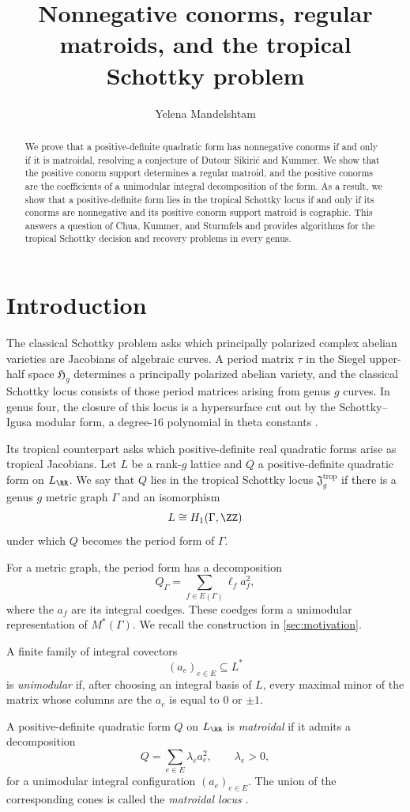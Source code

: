 \documentclass[11pt,letterpaper]{amsart}
\title{Nonnegative conorms, regular matroids, and the tropical Schottky problem}
\author{Yelena Mandelshtam}
\begin{document}
\begin{abstract}
    We prove that a positive-definite quadratic form has nonnegative conorms if and only if it is matroidal, resolving a conjecture of Dutour Sikiri\'c and Kummer. We show that the positive conorm support determines a regular matroid, and the positive conorms are the coefficients of a unimodular integral decomposition of the form. As a result, we show that a positive-definite form lies in the tropical Schottky locus if and only if its conorms are nonnegative and its positive conorm support matroid is cographic. This answers a question of Chua,
Kummer, and Sturmfels and provides algorithms for the tropical Schottky decision and recovery problems in every genus. 
\end{abstract}
\maketitle

\section{Introduction}

The classical Schottky problem asks which principally polarized complex abelian varieties are Jacobians of algebraic curves. A period matrix
$\tau$ in the Siegel upper-half space $\mathfrak H_g$ determines a principally polarized abelian variety, and the classical Schottky locus consists of those period matrices arising from genus $g$ curves. In genus four, the closure of this locus is a hypersurface cut out by the Schottky--Igusa modular form, a degree-$16$ polynomial in theta constants \cite{Igusa,chua2019schottky}. 


Its tropical counterpart asks which positive-definite real quadratic
forms arise as tropical Jacobians. Let $L$ be a rank-$g$ lattice and $Q$ a positive-definite quadratic form on
$L_{\RR}$. We say that $Q$ lies in the tropical Schottky locus
$\mathfrak{J}^{\mathrm{trop}}_g$ if there is a genus $g$ metric graph
$\Gamma$ and an isomorphism
\[
    L \cong H_1(\Gamma,\ZZ)
\]
under which $Q$ becomes the period form of $\Gamma$.

For a metric graph, the period form has a decomposition
\[
    Q_\Gamma=\sum_{f\in E(\Gamma)}\ell_fa_f^2,
\]
where the $a_f$ are its integral coedges. These coedges form a unimodular representation of $M^*(\Gamma)$. We recall the construction in \cref{sec:motivation}.

\begin{definition}
A finite family of integral covectors
\[
    (a_e)_{e\in E}\subseteq L^*
\]
is \emph{unimodular} if, after choosing an integral basis of $L$, every
maximal minor of the matrix whose columns are the $a_e$ is equal to
$0$ or $\pm1$.

A positive-definite quadratic form $Q$ on $L_{\RR}$ is
\emph{matroidal} if it admits a decomposition
\[
    Q=\sum_{e\in E}\lambda_e a_e^2,
    \qquad \lambda_e>0,
\]
for a unimodular integral configuration $(a_e)_{e\in E}$. The union
of the corresponding cones is called the \emph{matroidal locus}
\cite{meloviviani2012matroidal}.
\end{definition}
\end{document}
